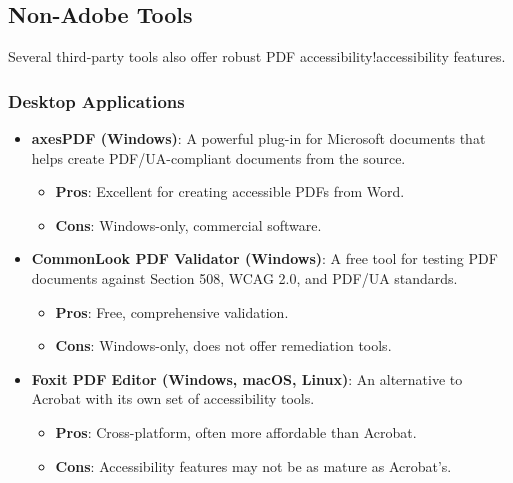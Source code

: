 \subsection{Non-Adobe Tools}
\label{subsec:non-adobe-tools}
Several third-party tools also offer robust PDF \gls{accessibility}!\gls{accessibility}  features.

\subsubsection{Desktop Applications}
\label{ssubsec:desktop-apps-pdf}
\begin{itemize}
	\item \textbf{axesPDF (Windows)}: A powerful plug-in for Microsoft documents that helps create PDF/UA-compliant documents from the source.
	      \begin{itemize}
		      \item \textbf{Pros}: Excellent for creating accessible PDFs from Word.
		      \item \textbf{Cons}: Windows-only, commercial software.
	      \end{itemize}
	\item \textbf{CommonLook PDF Validator (Windows)\supercite{AllyantValidator}}: A free tool for testing PDF documents against Section 508, WCAG 2.0, and PDF/UA standards.
	      \begin{itemize}
		      \item \textbf{Pros}: Free, comprehensive validation.
		      \item \textbf{Cons}: Windows-only, does not offer remediation tools.
	      \end{itemize}
	\item \textbf{Foxit PDF Editor (Windows, macOS, Linux)}: An alternative to Acrobat with its own set of accessibility tools.
	      \begin{itemize}
		      \item \textbf{Pros}: Cross-platform, often more affordable than Acrobat.
		      \item \textbf{Cons}: Accessibility features may not be as mature as Acrobat's.
	      \end{itemize}
\end{itemize}

